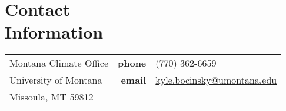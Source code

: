 \section{Contact \\ Information}
\vspace{0.035in}
\begin{tabular}{@{}p{2.5in}rl}
Montana Climate Office & {\bf phone} & (770) 362-6659 \\            
University of Montana & {\bf email} & \href{mailto: kyle.bocinsky@umontana.edu}{kyle.bocinsky@umontana.edu} \\         
Missoula, MT  59812 & %
\end{tabular}

